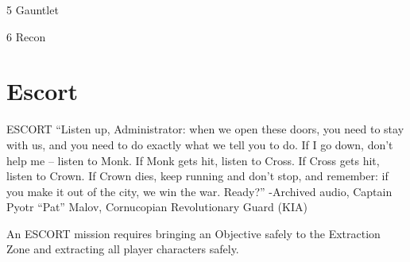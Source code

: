  5                                                      Gauntlet

 6                                                      Recon


\section{Escort}


                                                               ESCORT
                                                               “Listen up, Administrator: when we open these
                                                               doors, you need to stay with us, and you need to
                                                               do exactly what we tell you to do. If I go down,
                                                               don’t help me -- listen to Monk. If Monk gets hit,
                                                               listen to Cross. If Cross gets hit, listen to Crown.
                                                               If Crown dies, keep running and don’t stop, and
                                                               remember: if you make it out of the city, we win
                                                               the war. Ready?”
                                                               -Archived audio, Captain Pyotr “Pat” Malov,
                                                               Cornucopian Revolutionary Guard (KIA)

                                                               An ESCORT mission requires bringing an
                                                               Objective safely to the Extraction Zone and
                                                               extracting all player characters safely.

